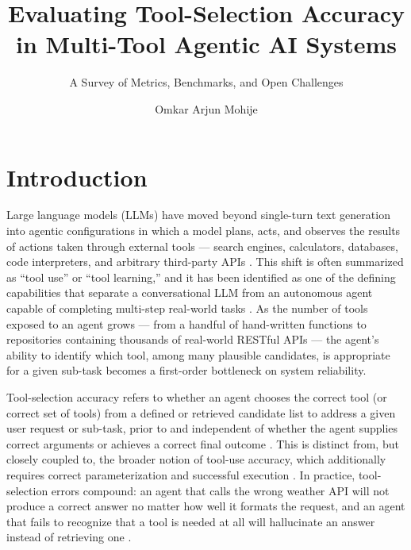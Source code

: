 \documentclass[acmsmall]{acmart}
\author{Omkar Arjun Mohije}
\affiliation{%
  \institution{Indian Institute of Information Technology, Allahabad}
  \department{M.Tech in IT (Specialization in AI/ML)}
  \city{Prayagraj}
  \state{Uttar Pradesh}
  \country{India}
}
\title{Evaluating Tool-Selection Accuracy in Multi-Tool Agentic AI Systems}
\subtitle{A Survey of Metrics, Benchmarks, and Open Challenges}
\begin{document}
\maketitle

\section{Introduction}
\label{sec:introduction}

Large language models (LLMs) have moved beyond single-turn text generation into agentic configurations in which a model plans, acts, and observes the results of actions taken through external tools --- search engines, calculators, databases, code interpreters, and arbitrary third-party APIs \citep{yao2023react,schick2023toolformer}. This shift is often summarized as ``tool use'' or ``tool learning,'' and it has been identified as one of the defining capabilities that separate a conversational LLM from an autonomous agent capable of completing multi-step real-world tasks \citep{qu2025survey}. As the number of tools exposed to an agent grows --- from a handful of hand-written functions to repositories containing thousands of real-world RESTful APIs \citep{qin2024toolllm,patil2023gorilla} --- the agent's ability to identify which tool, among many plausible candidates, is appropriate for a given sub-task becomes a first-order bottleneck on system reliability.

Tool-selection accuracy refers to whether an agent chooses the correct tool (or correct set of tools) from a defined or retrieved candidate list to address a given user request or sub-task, prior to and independent of whether the agent supplies correct arguments or achieves a correct final outcome \citep{mohammadi2025evaluation}. This is distinct from, but closely coupled to, the broader notion of tool-use accuracy, which additionally requires correct parameterization and successful execution \citep{shen2023taskbench,li2023apibank}. In practice, tool-selection errors compound: an agent that calls the wrong weather API will not produce a correct answer no matter how well it formats the request, and an agent that fails to recognize that a tool is needed at all will hallucinate an answer instead of retrieving one \citep{huang2024metatool}.
\end{document}
